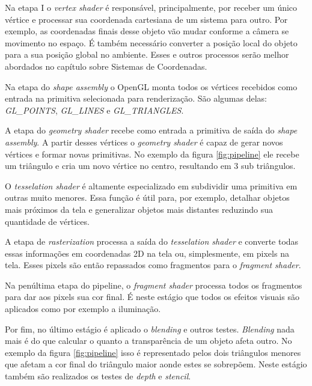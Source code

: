 \documentclass[12pt, 
openright, 
oneside, 
a4paper,    
brazil]{facom-ufu-abntex2}
\begin{document}
Na etapa I o \textit{vertex shader} é responsável, principalmente, por receber um único vértice e processar sua coordenada cartesiana de um sistema para outro. Por exemplo, as coordenadas finais desse objeto vão mudar conforme a câmera se movimento no espaço. É também necessário converter a posição local do objeto para a sua posição global no ambiente. Esses e outros processos serão melhor abordados no capítulo sobre Sistemas de Coordenadas.

Na etapa do \textit{shape assembly} o OpenGL monta todos os vértices recebidos como entrada na primitiva selecionada para renderização. São algumas delas: \textit{GL_POINTS}, \textit{GL_LINES} e \textit{GL_TRIANGLES}.

A etapa do \textit{geometry shader} recebe como entrada a primitiva de saída do \textit{shape assembly}. A partir desses vértices o \textit{geometry shader} é capaz de gerar novos vértices e formar novas primitivas. No exemplo da figura \ref{fig:pipeline} ele recebe um triângulo e cria um novo vértice no centro, resultando em 3 sub triângulos.

O \textit{tesselation shader} é altamente especializado em subdividir uma primitiva em outras muito menores. Essa função é útil para, por exemplo, detalhar objetos mais próximos da tela e generalizar objetos mais distantes reduzindo sua quantidade de vértices.

A etapa de \textit{rasterization} processa a saída do \textit{tesselation shader} e converte todas essas informações em coordenadas 2D na tela ou, simplesmente, em pixels na tela. Esses pixels são então repassados como fragmentos para o \textit{fragment shader}.

Na penúltima etapa do pipeline, o \textit{fragment shader} processa todos os fragmentos para dar aos pixels sua cor final. É neste estágio que todos os efeitos visuais são aplicados como por exemplo a iluminação.

Por fim, no último estágio é aplicado o \textit{blending} e  outros testes. \textit{Blending} nada mais é do que calcular o quanto a transparência de um objeto afeta outro. No exemplo da figura \ref{fig:pipeline} isso é representado pelos dois triângulos menores que afetam a cor final do triângulo maior aonde estes se sobrepõem. Neste estágio também são realizados os testes de \textit{depth} e \textit{stencil}.
\end{document}
